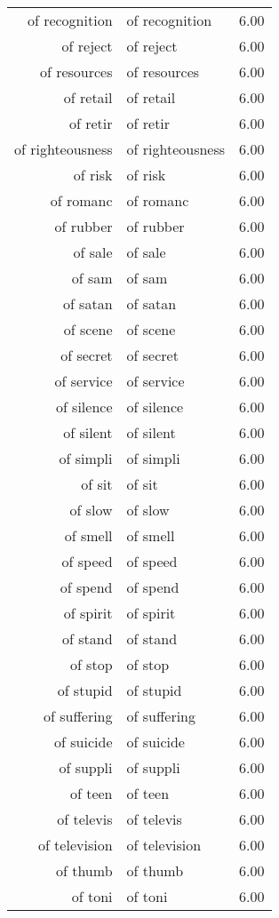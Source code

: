 \begin{table}[ht]
\begin{tabular}{rlr}
  of recognition & of recognition & 6.00 \\ 
  of reject & of reject & 6.00 \\ 
  of resources & of resources & 6.00 \\ 
  of retail & of retail & 6.00 \\ 
  of retir & of retir & 6.00 \\ 
  of righteousness & of righteousness & 6.00 \\ 
  of risk & of risk & 6.00 \\ 
  of romanc & of romanc & 6.00 \\ 
  of rubber & of rubber & 6.00 \\ 
  of sale & of sale & 6.00 \\ 
  of sam & of sam & 6.00 \\ 
  of satan & of satan & 6.00 \\ 
  of scene & of scene & 6.00 \\ 
  of secret & of secret & 6.00 \\ 
  of service & of service & 6.00 \\ 
  of silence & of silence & 6.00 \\ 
  of silent & of silent & 6.00 \\ 
  of simpli & of simpli & 6.00 \\ 
  of sit & of sit & 6.00 \\ 
  of slow & of slow & 6.00 \\ 
  of smell & of smell & 6.00 \\ 
  of speed & of speed & 6.00 \\ 
  of spend & of spend & 6.00 \\ 
  of spirit & of spirit & 6.00 \\ 
  of stand & of stand & 6.00 \\ 
  of stop & of stop & 6.00 \\ 
  of stupid & of stupid & 6.00 \\ 
  of suffering & of suffering & 6.00 \\ 
  of suicide & of suicide & 6.00 \\ 
  of suppli & of suppli & 6.00 \\ 
  of teen & of teen & 6.00 \\ 
  of televis & of televis & 6.00 \\ 
  of television & of television & 6.00 \\ 
  of thumb & of thumb & 6.00 \\ 
  of toni & of toni & 6.00 \\ 

\end{tabular}
\end{table}
